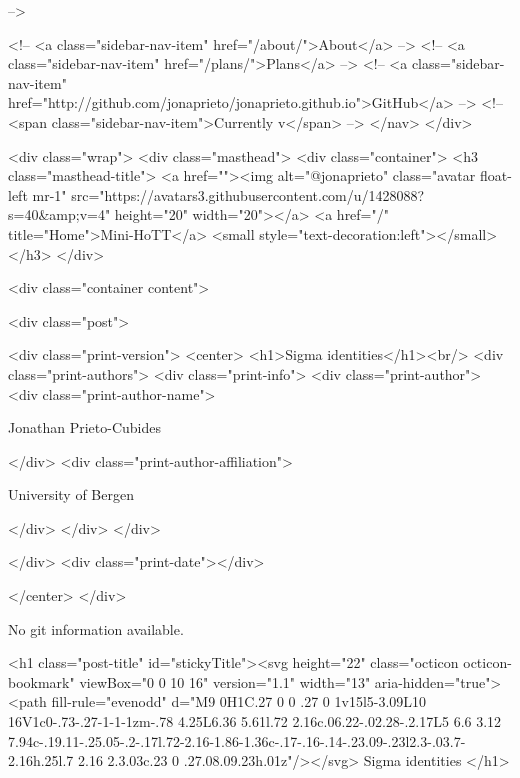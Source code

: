       
     -->

    <!-- <a class="sidebar-nav-item" href="/about/">About</a> -->
    <!-- <a class="sidebar-nav-item" href="/plans/">Plans</a> -->
    <!-- <a class="sidebar-nav-item" href="http://github.com/jonaprieto/jonaprieto.github.io">GitHub</a> -->
    <!-- <span class="sidebar-nav-item">Currently v</span> -->
  </nav>
</div>

    <div class="wrap">
      <div class="masthead">
        <div class="container">
          <h3 class="masthead-title">
            <a href=""><img alt="@jonaprieto" class="avatar float-left mr-1" src="https://avatars3.githubusercontent.com/u/1428088?s=40&amp;v=4" height="20" width="20"></a>
            <a href="/" title="Home">Mini-HoTT</a>
            <small style="text-decoration:left"></small>
          </h3>
        </div>
      
      <div class="container content">
        







<div class="post">

  <div class="print-version">
    <center>
      <h1>Sigma identities</h1><br/>
        <div class="print-authors">
          <div class="print-info">
            <div class="print-author">
              <div class="print-author-name">
                
                  Jonathan Prieto-Cubides
                
              </div>
              <div class="print-author-affiliation">
                
                  University of Bergen
                
                </div>
            </div>
          </div>
          
          
        </div>
        <div class="print-date"></div>
        
        
    </center>
  </div>

  
  No git information available.
  
  <h1 class="post-title" id="stickyTitle"><svg height="22" class="octicon octicon-bookmark" viewBox="0 0 10 16" version="1.1" width="13" aria-hidden="true"><path fill-rule="evenodd" d="M9 0H1C.27 0 0 .27 0 1v15l5-3.09L10 16V1c0-.73-.27-1-1-1zm-.78 4.25L6.36 5.61l.72 2.16c.06.22-.02.28-.2.17L5 6.6 3.12 7.94c-.19.11-.25.05-.2-.17l.72-2.16-1.86-1.36c-.17-.16-.14-.23.09-.23l2.3-.03.7-2.16h.25l.7 2.16 2.3.03c.23 0 .27.08.09.23h.01z"/></svg> Sigma identities
  </h1>

